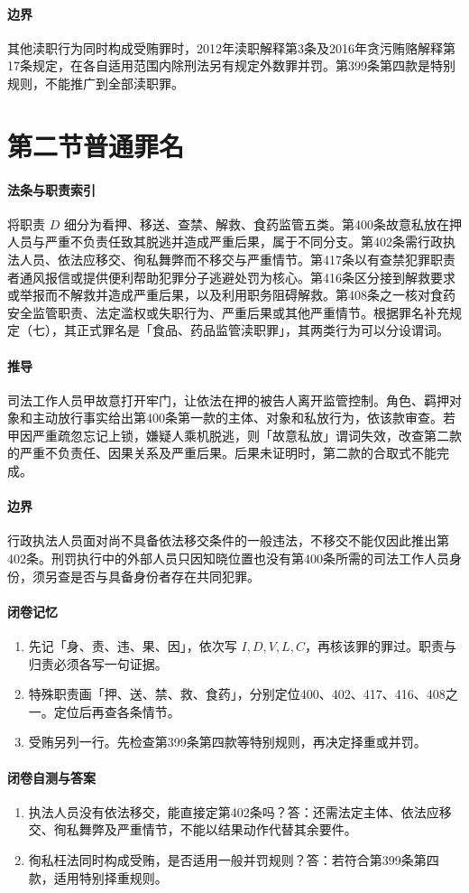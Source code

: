 \paragraph{边界}
其他渎职行为同时构成受贿罪时，2012年渎职解释第3条及2016年贪污贿赂解释第17条规定，在各自适用范围内除刑法另有规定外数罪并罚。第399条第四款是特别规则，不能推广到全部渎职罪。

\section{第二节\quad 普通罪名}

\paragraph{法条与职责索引}
将职责 \(D\) 细分为看押、移送、查禁、解救、食药监管五类。第400条故意私放在押人员与严重不负责任致其脱逃并造成严重后果，属于不同分支。第402条需行政执法人员、依法应移交、徇私舞弊而不移交与严重情节。第417条以有查禁犯罪职责者通风报信或提供便利帮助犯罪分子逃避处罚为核心。第416条区分接到解救要求或举报而不解救并造成严重后果，以及利用职务阻碍解救。第408条之一核对食药安全监管职责、法定滥权或失职行为、严重后果或其他严重情节。根据罪名补充规定（七），其正式罪名是「食品、药品监管渎职罪」，其两类行为可以分设谓词。

\paragraph{推导}
司法工作人员甲故意打开牢门，让依法在押的被告人离开监管控制。角色、羁押对象和主动放行事实给出第400条第一款的主体、对象和私放行为，依该款审查。若甲因严重疏忽忘记上锁，嫌疑人乘机脱逃，则「故意私放」谓词失效，改查第二款的严重不负责任、因果关系及严重后果。后果未证明时，第二款的合取式不能完成。

\paragraph{边界}
行政执法人员面对尚不具备依法移交条件的一般违法，不移交不能仅因此推出第402条。刑罚执行中的外部人员只因知晓位置也没有第400条所需的司法工作人员身份，须另查是否与具备身份者存在共同犯罪。

\paragraph{闭卷记忆}
\begin{enumerate}
\item 先记「身、责、违、果、因」，依次写 \(I,D,V,L,C\)，再核该罪的罪过。职责与归责必须各写一句证据。
\item 特殊职责画「押、送、禁、救、食药」，分别定位400、402、417、416、408之一。定位后再查各条情节。
\item 受贿另列一行。先检查第399条第四款等特别规则，再决定择重或并罚。
\end{enumerate}

\paragraph{闭卷自测与答案}
\begin{enumerate}
\item 执法人员没有依法移交，能直接定第402条吗？答：还需法定主体、依法应移交、徇私舞弊及严重情节，不能以结果动作代替其余要件。
\item 徇私枉法同时构成受贿，是否适用一般并罚规则？答：若符合第399条第四款，适用特别择重规则。
\end{enumerate}
